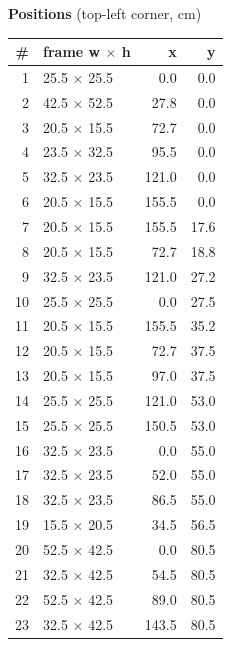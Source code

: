 \documentclass[a4paper,landscape,10pt]{article}
\begin{document}
\begin{minipage}[t]{0.25\textwidth}
\vspace{8pt}
{\bfseries Positions} (top-left corner, cm)\\[2pt]
\tiny
\begin{tabular}{@{}r l r r@{}}
\toprule
\# & frame w $\times$ h & x & y \\
\midrule
1 & 25.5 $\times$ 25.5 & 0.0 & 0.0 \\
2 & 42.5 $\times$ 52.5 & 27.8 & 0.0 \\
3 & 20.5 $\times$ 15.5 & 72.7 & 0.0 \\
4 & 23.5 $\times$ 32.5 & 95.5 & 0.0 \\
5 & 32.5 $\times$ 23.5 & 121.0 & 0.0 \\
6 & 20.5 $\times$ 15.5 & 155.5 & 0.0 \\
7 & 20.5 $\times$ 15.5 & 155.5 & 17.6 \\
8 & 20.5 $\times$ 15.5 & 72.7 & 18.8 \\
9 & 32.5 $\times$ 23.5 & 121.0 & 27.2 \\
10 & 25.5 $\times$ 25.5 & 0.0 & 27.5 \\
11 & 20.5 $\times$ 15.5 & 155.5 & 35.2 \\
12 & 20.5 $\times$ 15.5 & 72.7 & 37.5 \\
13 & 20.5 $\times$ 15.5 & 97.0 & 37.5 \\
14 & 25.5 $\times$ 25.5 & 121.0 & 53.0 \\
15 & 25.5 $\times$ 25.5 & 150.5 & 53.0 \\
16 & 32.5 $\times$ 23.5 & 0.0 & 55.0 \\
17 & 32.5 $\times$ 23.5 & 52.0 & 55.0 \\
18 & 32.5 $\times$ 23.5 & 86.5 & 55.0 \\
19 & 15.5 $\times$ 20.5 & 34.5 & 56.5 \\
20 & 52.5 $\times$ 42.5 & 0.0 & 80.5 \\
21 & 32.5 $\times$ 42.5 & 54.5 & 80.5 \\
22 & 52.5 $\times$ 42.5 & 89.0 & 80.5 \\
23 & 32.5 $\times$ 42.5 & 143.5 & 80.5 \\
\bottomrule
\end{tabular}
\end{minipage}
\clearpage
\end{document}

